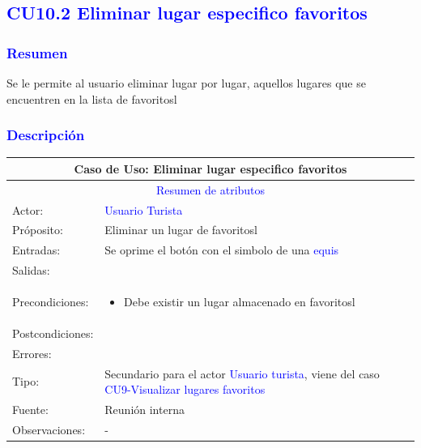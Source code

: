 

\pagebreak
\subsection{\textcolor{blue}{CU10.2 Eliminar lugar especifico favoritos}}
\subsubsection{\textcolor{blue}{Resumen}}
 Se le permite al usuario eliminar lugar por lugar, aquellos lugares que se encuentren en la lista de favoritosl
\subsubsection{\textcolor{blue}{Descripción}}
\begin{tabularx}{16cm}{||l|X||}
	\hline
	\multicolumn{2}{||c||}{Caso de Uso: Eliminar lugar especifico favoritos} \\
	\hline
	\multicolumn{2}{||c||}{\textcolor{blue}{Resumen de atributos}} \\
	\hline
	{Actor:} & {\textcolor{blue}{Usuario Turista}} \\
	\hline
	{Próposito:} & {Eliminar un lugar de favoritosl} \\
	\hline
	{Entradas:} & {Se oprime el botón con el simbolo de una \textcolor{blue}{equis}}\\
	\hline
	{Salidas:} & {}\\
	\hline
	{Precondiciones:} & {\begin{itemize}
	    \item Debe existir un lugar almacenado en favoritosl
	\end{itemize}}\\ 
	\hline
	{Postcondiciones:} & {}\\
	\hline
	{Errores:} & {} \\
	\hline
	{Tipo:} & {Secundario para el actor \textcolor{blue}{Usuario turista}, viene del caso \textcolor{blue}{CU9-Visualizar lugares favoritos}}\\
	\hline
	{Fuente:} & {Reunión interna} \\
	\hline
	{Observaciones:} & {-} \\
	\hline
\end{tabularx}

